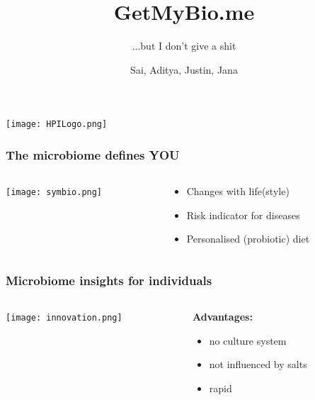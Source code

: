 \documentclass[xcolor=dvipsnames]{beamer}
\begin{document}
 \title{GetMyBio.me}
 \subtitle{...but I don't give a shit}
 \author{Sai, Aditya, Justin, Jana}
 
 
  \begin{frame}
    \titlepage
    \begin{center}
     \texttt{[image: HPILogo.png]}
    \end{center}
  \end{frame}
  
  \begin{frame}
    \frametitle{The microbiome defines YOU}
    	\begin{columns}
	    	\begin{column}{.6\textwidth}
	    	\texttt{[image: symbio.png]}
	    	\end{column}
	    	\begin{column}{.4\textwidth}
	    	\begin{itemize}
	    	\item Changes with life(style)
	    	\item Risk indicator for diseases
	    	\item Personalised (probiotic) diet
	    	\end{itemize}
	    	\end{column}
    	\end{columns}
    	 	
  \end{frame}
  
  \begin{frame}
      \frametitle{Microbiome insights for individuals}
      \begin{columns}
      		\begin{column}{.7\textwidth}
      		\texttt{[image: innovation.png]}
            \end{column}
            \begin{column}{.3\textwidth}
            	\textbf{Advantages:}
            	\begin{itemize}
            		\item no culture system
            		\item not influenced by salts
            		\item rapid
            	\end{itemize}
            \end{column}
      \end{columns}
    \end{frame}
\end{document}
